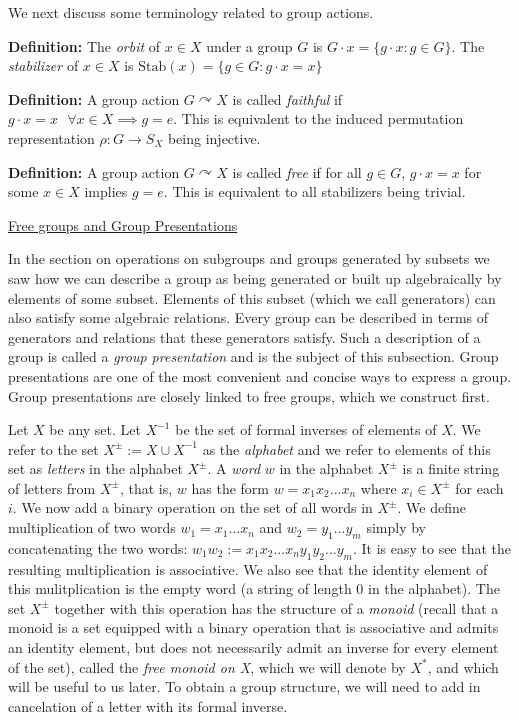 \documentclass[12pt]{article}
\newcommand{\vs}{\vskip10pt}
\begin{document}
	\vs 
	
	We next discuss some terminology related to group actions.
	
	\vs
	
	\textbf{Definition: } The \textit{orbit} of $x \in X$ under a group $G$ is $G\cdot x = \{g \cdot x: g \in G\}$. The \textit{stabilizer} of $x \in X$ is $\text{Stab}(x) = \{g \in G: g\cdot x = x\}$
	
	\vs
	
	\textbf{Definition: } A group action $G \curvearrowright X$ is called \textit{faithful} if $g \cdot x = x \text{ } \forall x \in X \implies g = e$. This is equivalent to the induced permutation representation $\rho: G \rightarrow S_X$ being injective. 
	
	\vs 
	
	\textbf{Definition: } A group action $G \curvearrowright X$ is called \textit{free} if for all $g \in G$, $g \cdot x = x$ for some $x \in X$ implies $g = e$. This is equivalent to all stabilizers being trivial.
	
	\vs
	
	\underline{Free groups and Group Presentations}
	
	In the section on operations on subgroups and groups generated by subsets we saw how we can describe a group as being generated or built up algebraically by elements of some subset. Elements of this subset (which we call generators) can also satisfy some algebraic relations. Every group can be described in terms of generators and relations that these generators satisfy. Such a description of a group is called a \textit{group presentation} and is the subject of this subsection. Group presentations are one of the most convenient and concise ways to express a group. Group presentations are closely linked to free groups, which we construct first. 
	
	\vs 
	
	Let $X$ be any set. Let $X^{-1}$ be the set of formal inverses of elements of $X$. We refer to the set $X^{\pm} := X \cup X^{-1}$ as the \textit{alphabet} and we refer to elements of this set as \textit{letters} in the alphabet $X^{\pm}$. A \textit{word} $w$ in the alphabet $X^{\pm}$ is a finite string of letters from $X^{\pm}$, that is, $w$ has the form $w = x_1 x_2 ... x_n$ where $x_i \in X^{\pm}$ for each $i$. We now add a binary operation on the set of all words in $X^{\pm}$. We define multiplication of two words $w_1 = x_1 ... x_n$ and $w_2 = y_1 ... y_m$ simply by concatenating the two words: $w_1 w_2 := x_1 x_2  ... x_n y_1 y_2 ... y_m$. It is easy to see that the resulting multiplication is associative. We also see that the identity element of this mulitplication is the empty word (a string of length 0 in the alphabet). The set $X^{\pm}$ together with this operation has the structure of a \textit{monoid} (recall that a monoid is a set equipped with a binary operation that is associative and admits an identity element, but does not necessarily admit an inverse for every element of the set), called the \textit{free monoid on X}, which we will denote by $X^*$, and which will be useful to us later. To obtain a group structure, we will need to add in cancelation of a letter with its formal inverse. 
	
\end{document}
